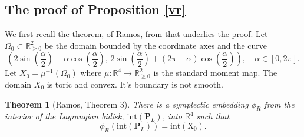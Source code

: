 \documentclass[12pt]{amsart}
\newtheorem{theorem}{Theorem}[section]
\theoremstyle{definition}
\newcommand{\RR}{{\mathbb R}}
\begin{document}
\subsection{The proof of Proposition \ref{vr}}

We first recall the theorem, of Ramos, from \cite{vr} that underlies the proof. Let $\Omega_0 \subset \RR^2_{\geq 0}$ be the domain bounded by the coordinate axes and the curve 
$$
\left( 2\sin \left( \frac{\alpha}{2}\right)-\alpha \cos \left( \frac{\alpha}{2}\right),\, 2\sin \left( \frac{\alpha}{2}\right)+(2\pi-\alpha) \cos \left( \frac{\alpha}{2}\right) \right), \quad \alpha \in [0,2\pi].
$$
Let $X_0 = \mu^{-1}(\Omega_0)$ where $\mu \colon \RR^4 \to \RR^2_{\geq 0}$ is the standard moment map. The domain $X_0$ is toric and convex. It's boundary is not smooth.

\begin{theorem}[Ramos, \cite{vr} Theorem 3] There is a symplectic embedding $\phi_R$ from the interior of the Lagrangian bidisk, $\mathrm{int}(\mathbf{P}_L)$, into  $\RR^4$ such that $$\phi_R(\mathrm{int}(\mathbf{P}_L)) = \mathrm{int(X_0)}.$$
\end{theorem}
\end{document}
